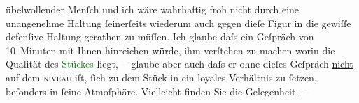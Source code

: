                   übelwollender Menſch und ich wäre wahrhaftig froh nicht durch eine unangenehme
                  Haltung ſeinerſeits wiederum auch gegen dieſe Figur in die gewiſſe defenſive {\pb}Haltung gerathen zu müſſen. Ich
                  glaube daſs ein Geſpräch von 10 Minuten mit Ihnen hinreichen würde, ihm verſtehen
                  zu machen worin die Qualität des \textcolor{green}{Stückes}{} liegt, – glaube aber auch daſs er ohne dieſes Geſpräch \uline{nicht} auf dem \textsc{niveau} iſt,
                  ſich zu dem Stück in ein loyales Verhältnis zu ſetzen, beſonders in ſeine
                  Atmoſphäre. Vielleicht finden Sie die Gelegenheit. – \pend
           \endnumbering{}  
      